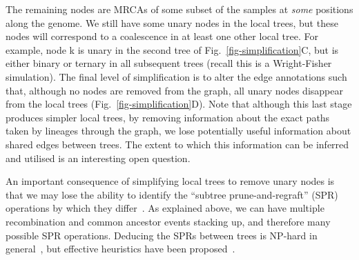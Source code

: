 \documentclass{article}
\begin{document}
The remaining nodes are MRCAs of some subset of the samples
at \emph{some} positions along the genome. We still have
some unary nodes in the local trees, but these nodes will
correspond to a coalescence in at least one other
local tree. For example, node  \textsf{k} is unary in the second tree
of Fig.~\ref{fig-simplification}C, but is either binary
or ternary in all subsequent trees (recall this is a Wright-Fisher
simulation). The final level of simplification is to alter the edge annotations
such that, although no nodes are removed from the graph, all
unary nodes disappear from the local trees (Fig.~\ref{fig-simplification}D).
Note that although this last stage produces simpler local trees, by
removing information about the exact paths taken by lineages through
the graph, we lose potentially useful information about shared edges
between trees. The extent to which this information can be inferred
and utilised is an interesting open question.

An important consequence of simplifying local trees to remove
unary nodes is that we may lose the ability to identify
the ``subtree prune-and-regraft'' (SPR) operations
by which they differ~\citep{hein1990reconstructing,song2003on,song2006properties}.
As explained above, we can have multiple recombination and
common ancestor events stacking up, and therefore
many possible SPR operations. Deducing the SPRs between
trees is NP-hard in
general~\citep{hein1996complexity,allen2001subtree,bordewich2005computational},
but effective heuristics have been proposed~\citep{rasmussen2022espalier}.

\end{document}
